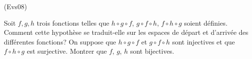 \begin{tiny}(Evs08)\end{tiny} Soit $f,g,h$ trois fonctions telles que $h\circ g\circ f$, $g\circ
f\circ h$, $f\circ h\circ g$ soient d{\'e}finies. Comment cette hypothèse se traduit-elle sur les espaces de départ et d'arrivée des différentes fonctions? On suppose que $h\circ g\circ f$ et $g\circ f\circ h$ sont injectives et que
$f\circ h\circ g$ est surjective.\newline
Montrer que $f$, $g$, $h$ sont bijectives.
